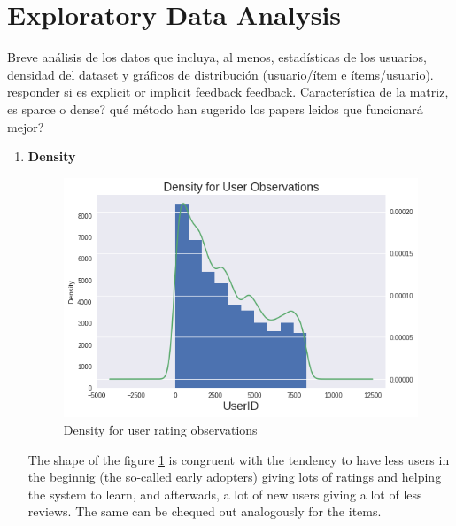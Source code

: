 \documentclass[letterpaper, 10 pt, conference]{ieeeconf}  %
\begin{document}
\section{Exploratory Data Analysis}

Breve análisis de los datos que incluya, al menos, estadísticas
de los usuarios, densidad del dataset y gráficos de distribución (usuario/ítem e ítems/usuario).
responder si es explicit or implicit feedback feedback. Característica de la matriz, es sparce o dense? qué método han sugerido los papers leidos que funcionará mejor?

\begin{enumerate}
    \item \textbf{Density}
    
    
        \begin{figure}[h]
            
            \includegraphics[scale=0.4]{userID_hist-kde.png}
            \centering
            \caption{Density for user rating observations}
            \label{fig:user-density}
            
        \end{figure}
        
        The shape of the figure \ref{fig:user-density} is congruent with the tendency to have less users in the beginnig (the so-called early adopters) giving lots of ratings and helping the system to learn, and afterwads, a lot of new users giving a lot of less reviews. The same can be chequed out analogously for the items.

 


\end{enumerate}
\end{document}
